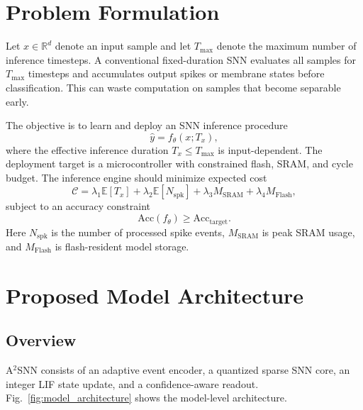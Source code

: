 \documentclass[journal]{IEEEtran}
\newcommand{\modelname}{A$^2$SNN}
\begin{document}
\section{Problem Formulation}
Let $x \in \mathbb{R}^{d}$ denote an input sample and let $T_{\max}$ denote the maximum number of inference timesteps. A conventional fixed-duration SNN evaluates all samples for $T_{\max}$ timesteps and accumulates output spikes or membrane states before classification. This can waste computation on samples that become separable early.

The objective is to learn and deploy an SNN inference procedure
\begin{equation}
    \hat{y} = f_{\theta}(x; T_x),
\end{equation}
where the effective inference duration $T_x \leq T_{\max}$ is input-dependent. The deployment target is a microcontroller with constrained flash, SRAM, and cycle budget. The inference engine should minimize expected cost
\begin{equation}
    \mathcal{C} = \lambda_1 \mathbb{E}[T_x] + \lambda_2 \mathbb{E}[N_{\mathrm{spk}}] + \lambda_3 M_{\mathrm{SRAM}} + \lambda_4 M_{\mathrm{Flash}},
\end{equation}
subject to an accuracy constraint
\begin{equation}
    \mathrm{Acc}(f_{\theta}) \geq \mathrm{Acc}_{\mathrm{target}}.
\end{equation}
Here $N_{\mathrm{spk}}$ is the number of processed spike events, $M_{\mathrm{SRAM}}$ is peak SRAM usage, and $M_{\mathrm{Flash}}$ is flash-resident model storage.

\section{Proposed Model Architecture}
\subsection{Overview}
\modelname{} consists of an adaptive event encoder, a quantized sparse SNN core, an integer LIF state update, and a confidence-aware readout. Fig.~\ref{fig:model_architecture} shows the model-level architecture.
\end{document}
